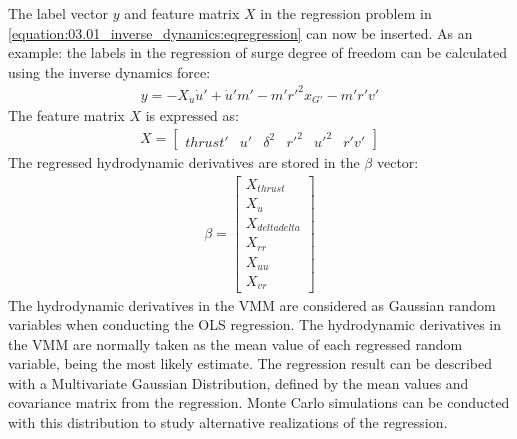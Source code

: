 \documentclass[review]{elsarticle}
\begin{document}
\sphinxAtStartPar
The label vector \(y\) and feature matrix \(X\) in the regression problem in \autoref{equation:03.01_inverse_dynamics:eqregression} can now be inserted. As an example: the labels in the regression of surge degree of freedom can be calculated using the inverse dynamics force:
\begin{equation}\label{equation:03.01_inverse_dynamics:diff_eq_X_y}
\begin{split}\displaystyle y = - X_{\dot{u}} \dot{u}' + \dot{u}' m' - m' r'^{2} x_{G'} - m' r' v'\end{split}
\end{equation}
\sphinxAtStartPar
The feature matrix \(X\) is expressed as:
\begin{equation}\label{equation:03.01_inverse_dynamics:diff_eq_X_X}
\begin{split}\displaystyle X = \left[\begin{matrix}thrust' & u' & \delta^{2} & r'^{2} & u'^{2} & r' v'\end{matrix}\right]\end{split}
\end{equation}
\sphinxAtStartPar
The regressed hydrodynamic derivatives are stored in the \(\beta\) vector:
\begin{equation}\label{equation:03.01_inverse_dynamics:diff_eq_X_beta}
\begin{split}\displaystyle \beta = \left[\begin{matrix}X_{thrust}\\X_{u}\\X_{deltadelta}\\X_{rr}\\X_{uu}\\X_{vr}\end{matrix}\right]\end{split}
\end{equation}
\sphinxAtStartPar
The hydrodynamic derivatives in the VMM are considered as Gaussian random variables when conducting the OLS regression. The hydrodynamic derivatives in the VMM are normally taken as the mean value of each regressed random variable, being the most likely estimate. The regression result can be described with a Multivariate Gaussian Distribution, defined by the mean values and covariance matrix from the regression. Monte Carlo simulations can be conducted with this distribution to study alternative realizations of the regression.
\end{document}
